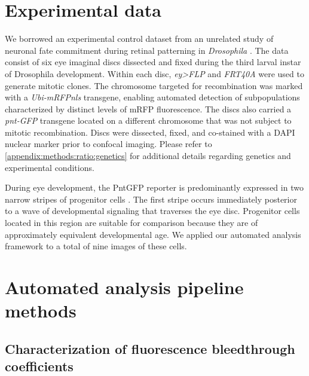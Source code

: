 \graphicspath{ {./figures/clones/} }


\section{Experimental data}
\label{appendix:methods:clones:data}

We borrowed an experimental control dataset from an unrelated study of neuronal fate commitment during retinal patterning in \textit{Drosophila} \cite{Bernasek2018}. The data consist of six eye imaginal discs dissected and fixed during the third larval instar of Drosophila development. Within each disc, \textit{ey>FLP} and \textit{FRT40A} were used to generate mitotic clones. The chromosome targeted for recombination was marked with a \textit{Ubi-mRFPnls} transgene, enabling automated detection of subpopulations characterized by distinct levels of mRFP fluorescence. The discs also carried a \textit{pnt-GFP} transgene located on a different chromosome that was not subject to mitotic recombination. Discs were dissected, fixed, and co-stained with a DAPI nuclear marker prior to confocal imaging. Please refer to \ref{appendix:methods:ratio:genetics} for additional details regarding genetics and experimental conditions.

During eye development, the PntGFP reporter is predominantly expressed in two narrow stripes of progenitor cells \cite{Bernasek2018}. The first stripe occurs immediately posterior to a wave of developmental signaling that traverses the eye disc. Progenitor cells located in this region are suitable for comparison because they are of approximately equivalent developmental age. We applied our automated analysis framework to a total of nine images of these cells.

\section{Automated analysis pipeline methods}

\subsection{Characterization of fluorescence bleedthrough coefficients}
\label{appendix:methods:clones:model_fit}

